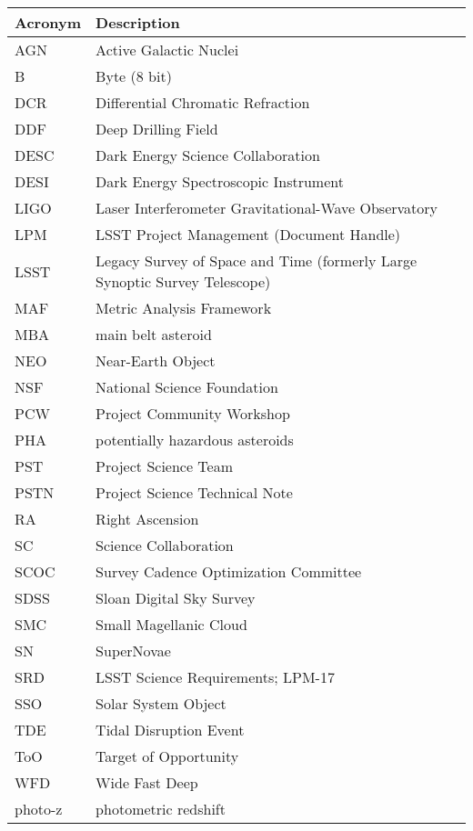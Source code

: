 \addtocounter{table}{-1}
\begin{longtable}{p{}p{}}\hline
\textbf{Acronym} & \textbf{Description}  \\\hline

AGN & Active Galactic Nuclei \\\hline
B & Byte (8 bit) \\\hline
DCR & Differential Chromatic Refraction \\\hline
DDF & Deep Drilling Field \\\hline
DESC & Dark Energy Science Collaboration \\\hline
DESI & Dark Energy Spectroscopic Instrument \\\hline
LIGO & Laser Interferometer Gravitational-Wave Observatory \\\hline
LPM & LSST Project Management (Document Handle) \\\hline
LSST & Legacy Survey of Space and Time (formerly Large Synoptic Survey Telescope) \\\hline
MAF & Metric Analysis Framework \\\hline
MBA & main belt asteroid \\\hline
NEO & Near-Earth Object \\\hline
NSF & National Science Foundation \\\hline
PCW & Project Community Workshop \\\hline
PHA & potentially hazardous asteroids \\\hline
PST & Project Science Team \\\hline
PSTN & Project Science Technical Note \\\hline
RA & Right Ascension \\\hline
SC & Science Collaboration \\\hline
SCOC & Survey Cadence Optimization Committee \\\hline
SDSS & Sloan Digital Sky Survey \\\hline
SMC & Small Magellanic Cloud \\\hline
SN & SuperNovae \\\hline
SRD & LSST Science Requirements; LPM-17 \\\hline
SSO & Solar System Object \\\hline
TDE & Tidal Disruption Event \\\hline
ToO & Target of Opportunity \\\hline
WFD & Wide Fast Deep \\\hline
photo-z & photometric redshift \\\hline
\end{longtable}
